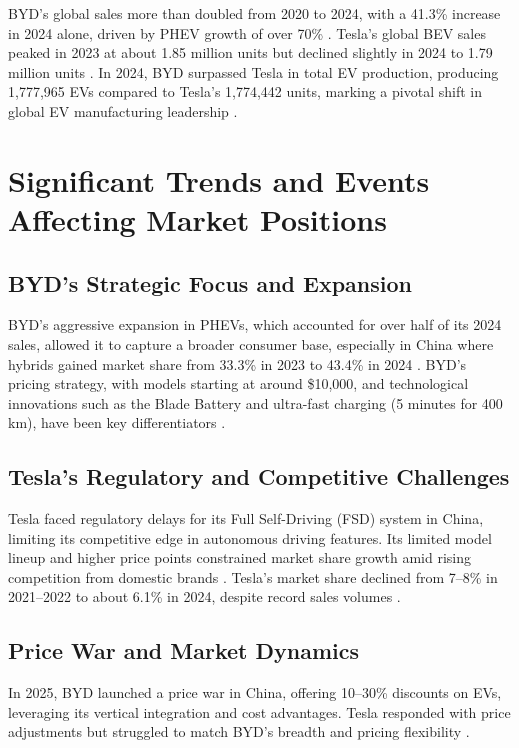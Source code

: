 \documentclass{article}
\begin{document}
BYD's global sales more than doubled from 2020 to 2024, with a 41.3\% increase in 2024 alone, driven by PHEV growth of over 70\% \citep{bestcars2024}. Tesla's global BEV sales peaked in 2023 at about 1.85 million units but declined slightly in 2024 to 1.79 million units \citep{insideevs2024}. In 2024, BYD surpassed Tesla in total EV production, producing 1,777,965 EVs compared to Tesla's 1,774,442 units, marking a pivotal shift in global EV manufacturing leadership \citep{statista2024}.

\section{Significant Trends and Events Affecting Market Positions}

\subsection{BYD's Strategic Focus and Expansion}

BYD's aggressive expansion in PHEVs, which accounted for over half of its 2024 sales, allowed it to capture a broader consumer base, especially in China where hybrids gained market share from 33.3\% in 2023 to 43.4\% in 2024 \citep{autovista2025, tridens2025}. BYD's pricing strategy, with models starting at around \$10,000, and technological innovations such as the Blade Battery and ultra-fast charging (5 minutes for 400 km), have been key differentiators \citep{scmp2024, cnn2025}.

\subsection{Tesla's Regulatory and Competitive Challenges}

Tesla faced regulatory delays for its Full Self-Driving (FSD) system in China, limiting its competitive edge in autonomous driving features. Its limited model lineup and higher price points constrained market share growth amid rising competition from domestic brands \citep{cnn2025, investors2025}. Tesla's market share declined from 7--8\% in 2021--2022 to about 6.1\% in 2024, despite record sales volumes \citep{cnevpost2025}.

\subsection{Price War and Market Dynamics}

In 2025, BYD launched a price war in China, offering 10--30\% discounts on EVs, leveraging its vertical integration and cost advantages. Tesla responded with price adjustments but struggled to match BYD's breadth and pricing flexibility \citep{investors2025}.
\end{document}
